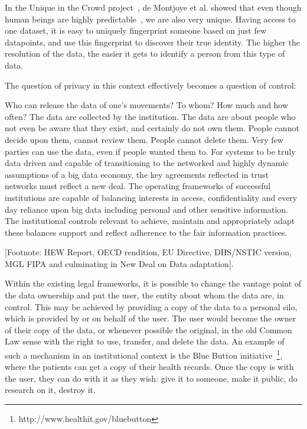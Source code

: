 In the Unique in the Crowd project~\cite{de2013unique}, de Montjoye et al. showed that even though human beings are highly predictable~\cite{song2010limits}, we are also very unique.
Having access to one dataset, it is easy to uniquely fingerprint someone based on just few datapoints, and use this fingerprint to discover their true identity.
The higher the resolution of the data, the easier it gets to identify a person from this type of data.

The question of privacy in this context effectively becomes a question of control:

Who can release the data of one's movements?
To whom?
How much and how often?
The data are collected by the institution.
The data are about people who not even be aware that they exist, and certainly do not own them.
People cannot decide upon them, cannot review them.
People cannot delete them.
Very few parties can use the data, even if people wanted them to.
For systems to be truly data driven and capable of transitioning to the networked and highly dynamic assumptions of a big data economy, the key agreements reflected in trust networks must reflect a new deal.
The operating frameworks of successful institutions are capable of balancing interests in access, confidentiality and every day reliance upon big data including personal and other sensitive information.
The institutional controls relevant to achieve, maintain and appropriately adapt these balances support and reflect adherence to the fair information practices.

[Footnote: HEW Report, OECD rendition, EU Directive, DHS/NSTIC version, MGL FIPA and culminating in New Deal on Data adaptation].

Within the existing legal frameworks, it is possible to change the vantage point of the data ownership and put the user, the entity about whom the data are, in control.
This may be achieved by providing a copy of the data to a personal silo, which is provided by or on behalf of the user.
The user would become the owner of their copy of the data, or whenever possible the original, in the old Common Law sense with the right to use, transfer, and delete the data.
An example of such a mechanism in an institutional context is the Blue Button initiative~\footnote{http://www.healthit.gov/bluebutton}, where the patients can get a copy of their health records. 
Once the copy is with the user, they can do with it as they wish: give it to someone, make it public, do research on it, destroy it.


